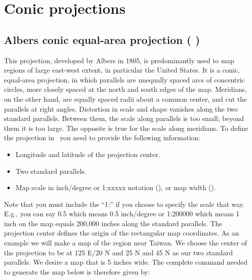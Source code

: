 \section{Conic projections}

\subsection{Albers conic equal-area projection ( )}

This projection, developed by Albers in 1805, is predominantly
used to map regions of large east-west extent, in particular
the United States.  It is a conic, equal-area projection, in
which parallels are unequally spaced arcs of concentric circles,
more closely spaced at the north and south edges of the map.
Meridians, on the other hand, are equally spaced radii about
a common center, and cut the parallels at right angles.
Distortion in scale and shape vanishes along the two standard
parallels.  Between them, the scale along parallels is too small;
beyond them it is too large.  The opposite is true for the scale
along meridians.  To define the projection in \GMT\ you need to
provide the following information:

\begin{itemize}
\item Longitude and latitude of the projection center.
\item Two standard parallels.
\item Map scale in inch/degree or 1:xxxxx notation (), or map width ().
\end{itemize}

Note that you must include the ``1:'' if you choose to specify the
scale that way.  E.g., you can say 0.5 which means 0.5 inch/degree
or 1:200000 which means 1 inch on the map equals 200,000 inches
along the standard parallels.  The projection center defines the
origin of the rectangular map coordinates.  As an example we will
make a map of the region near Taiwan.  We choose the center of
the projection to be at 125 \DS E/20 \DS N and 25 \DS N
and 45 \DS N as our two standard parallels.  We desire a map
that is 5 inches wide.  The complete command needed to generate
the map below is therefore given by: 


